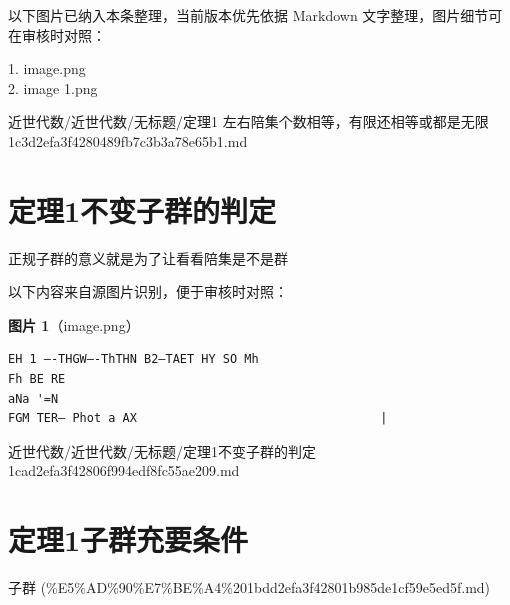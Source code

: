 \begin{note}[关联图片]
以下图片已纳入本条整理，当前版本优先依据 Markdown 文字整理，图片细节可在审核时对照：

1. image.png\\
2. image 1.png\\

\end{note}

\begin{note}[来源路径]

近世代数/近世代数/无标题/定理1 左右陪集个数相等，有限还相等或都是无限 1c3d2efa3f4280489fb7c3b3a78e65b1.md

\end{note}

\section*{定理1不变子群的判定}

\begin{theorem}[定理1不变子群的判定]

正规子群的意义就是为了让看看陪集是不是群

\end{theorem}

\begin{note}
以下内容来自源图片识别，便于审核时对照：

\textbf{图片 1}（image.png）
\begin{Verbatim}[fontsize=\small]
EH 1 —-THGW—-ThTHN B2—TAET HY SO Mh
Fh BE RE
aNa '=N
FGM TER— Phot a AX                                  |
\end{Verbatim}

\end{note}

\begin{note}[来源路径]

近世代数/近世代数/无标题/定理1不变子群的判定 1cad2efa3f42806f994edf8fc55ae209.md

\end{note}

\section*{定理1子群充要条件}

\begin{note}[来源上级主题]

子群 (\%E5\%AD\%90\%E7\%BE\%A4\%201bdd2efa3f42801b985de1cf59e5ed5f.md)

\end{note}

